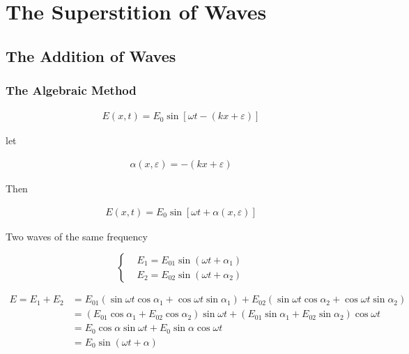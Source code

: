 \chapter{The Superstition of Waves}

\section{The Addition of Waves}

\subsection{The Algebraic Method}

\begin{equation*}
  \begin{aligned}
    E \left( x, t \right) = E_0 \sin \left[ \omega t - \left( k x + \varepsilon \right) \right]
  \end{aligned}
\end{equation*}

let

\begin{equation*}
  \begin{aligned}
    \alpha \left( x , \varepsilon \right) = - \left( k x + \varepsilon \right)
  \end{aligned}
\end{equation*}

Then

\begin{equation*}
  \begin{aligned}
    E \left( x , t \right) = E_0 \sin \left[ \omega t + \alpha \left( x , \varepsilon \right) \right]
  \end{aligned}
\end{equation*}

Two waves of the same frequency

\begin{equation*}
  \left\{
    \begin{aligned}
      & E_1 = E_{01} \sin \left( \omega t + \alpha_1 \right) \\
      & E_2 = E_{02} \sin \left( \omega t + \alpha_2 \right) 
    \end{aligned}
  \right.
\end{equation*}

\begin{equation*}
  \begin{aligned}
    E = E_1 + E_2 &= E_{01} \left( \sin \omega t \cos \alpha_1 + \cos \omega t \sin \alpha_1 \right) + E_{02} \left( \sin \omega t \cos \alpha_2 + \cos \omega t \sin \alpha_2  \right) \\
    &= \left( E_{01} \cos \alpha_1 + E_{02} \cos \alpha_2 \right) \sin \omega t + \left( E_{01} \sin \alpha_1 + E_{02} \sin \alpha_2 \right) \cos \omega t \\
    &= E_0 \cos \alpha \sin \omega t + E_0 \sin \alpha \cos \omega t \\
    &= E_0 \sin \left( \omega t + \alpha \right)
  \end{aligned}
\end{equation*}


